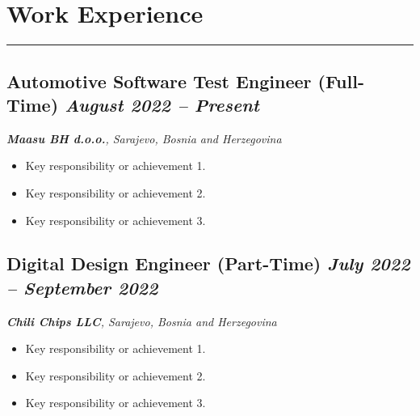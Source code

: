 \section*{Work Experience}
\vspace{-5pt} 
\noindent\rule{\textwidth}{0.4pt} %

\subsection*{\textbf{Automotive Software Test Engineer (Full-Time)} \hfill \textit{August 2022 -- Present}} 
\noindent\textit{\textbf{Maasu BH d.o.o.}, Sarajevo, Bosnia and Herzegovina}
\begin{itemize}[leftmargin=*,noitemsep,topsep=3pt]
    \item Key responsibility or achievement 1.
    \item Key responsibility or achievement 2.
    \item Key responsibility or achievement 3.
\end{itemize}
\vspace{10pt}

\subsection*{\textbf{Digital Design Engineer (Part-Time)} \hfill \textit{July 2022 -- September 2022}} 
\noindent\textit{\textbf{Chili Chips LLC}, Sarajevo, Bosnia and Herzegovina}
\begin{itemize}[leftmargin=*,noitemsep,topsep=3pt]
    \item Key responsibility or achievement 1.
    \item Key responsibility or achievement 2.
    \item Key responsibility or achievement 3.
\end{itemize}
\vspace{20pt}